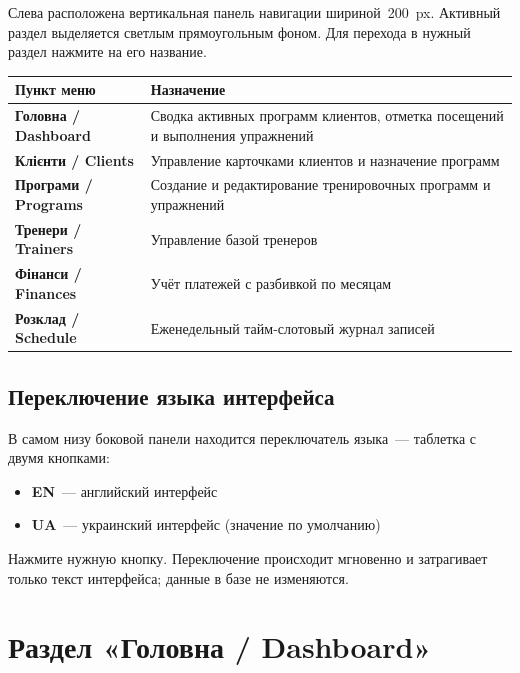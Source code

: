 \documentclass[12pt,a4paper]{article}
\begin{document}
Слева расположена вертикальная панель навигации шириной~200~px.
Активный раздел выделяется светлым прямоугольным фоном.
Для перехода в нужный раздел нажмите на его название.

\medskip
\begin{center}
\begin{tabularx}{0.85\textwidth}{>{\bfseries}lX}
  \toprule
  Пункт меню & Назначение \\
  \midrule
  Головна / Dashboard &
    Сводка активных программ клиентов, отметка посещений
    и выполнения упражнений \\
  Клієнти / Clients &
    Управление карточками клиентов и назначение программ \\
  Програми / Programs &
    Создание и редактирование тренировочных программ и упражнений \\
  Тренери / Trainers &
    Управление базой тренеров \\
  Фінанси / Finances &
    Учёт платежей с разбивкой по месяцам \\
  Розклад / Schedule &
    Еженедельный тайм-слотовый журнал записей \\
  \bottomrule
\end{tabularx}
\end{center}

\subsection{Переключение языка интерфейса}

В самом низу боковой панели находится переключатель языка~---
таблетка с двумя кнопками:

\begin{itemize}
  \item \textbf{EN}~--- английский интерфейс
  \item \textbf{UA}~--- украинский интерфейс (значение по умолчанию)
\end{itemize}

Нажмите нужную кнопку. Переключение происходит мгновенно и затрагивает
только текст интерфейса; данные в базе не изменяются.

\section{Раздел «Головна / Dashboard»}
\end{document}
